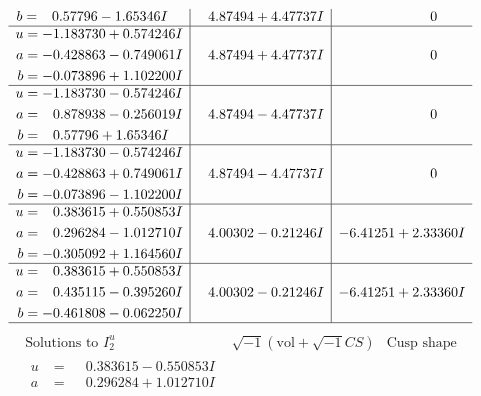 \documentclass[1p]{elsarticle_modified}
\theoremstyle{definition}
\newcommand{\I}{\sqrt{-1}}
\begin{document}
$$\begin{array}{c|c|c}
\begin{aligned}
b &= \phantom{-}0.57796 - 1.65346 I\end{aligned}
 & \phantom{-}4.87494 + 4.47737 I & \phantom{-0.000000 } 0 \\ \hline\begin{aligned}
u &= -1.183730 + 0.574246 I \\
a &= -0.428863 - 0.749061 I \\
b &= -0.073896 + 1.102200 I\end{aligned}
 & \phantom{-}4.87494 + 4.47737 I & \phantom{-0.000000 } 0 \\ \hline\begin{aligned}
u &= -1.183730 - 0.574246 I \\
a &= \phantom{-}0.878938 - 0.256019 I \\
b &= \phantom{-}0.57796 + 1.65346 I\end{aligned}
 & \phantom{-}4.87494 - 4.47737 I & \phantom{-0.000000 } 0 \\ \hline\begin{aligned}
u &= -1.183730 - 0.574246 I \\
a &= -0.428863 + 0.749061 I \\
b &= -0.073896 - 1.102200 I\end{aligned}
 & \phantom{-}4.87494 - 4.47737 I & \phantom{-0.000000 } 0 \\ \hline\begin{aligned}
u &= \phantom{-}0.383615 + 0.550853 I \\
a &= \phantom{-}0.296284 - 1.012710 I \\
b &= -0.305092 + 1.164560 I\end{aligned}
 & \phantom{-}4.00302 - 0.21246 I & -6.41251 + 2.33360 I \\ \hline\begin{aligned}
u &= \phantom{-}0.383615 + 0.550853 I \\
a &= \phantom{-}0.435115 - 0.395260 I \\
b &= -0.461808 - 0.062250 I\end{aligned}
 & \phantom{-}4.00302 - 0.21246 I & -6.41251 + 2.33360 I\\
 \hline 
 \end{array}$$\newpage$$\begin{array}{c|c|c}  
\text{Solutions to }I^u_{2}& \I (\text{vol} + \sqrt{-1}CS) & \text{Cusp shape}\\
 \hline 
\begin{aligned}
u &= \phantom{-}0.383615 - 0.550853 I \\
a &= \phantom{-}0.296284 + 1.012710 I \\

\end{aligned}
\end{array}$$
\end{document}
